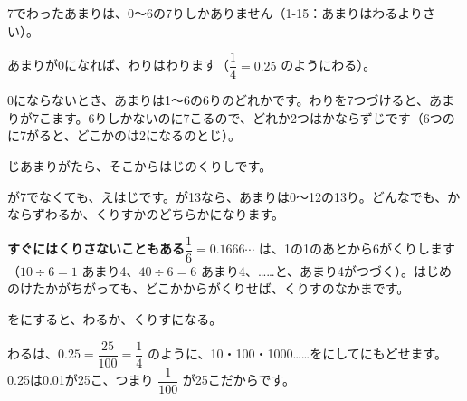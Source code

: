 7でわったあまりは、0〜6の7りしかありません（1-15：あまりはわるよりさい）。
\begin{enumerate}[label={\bkcircled[bkGreen]{\arabic*}}, leftmargin=2.4\zw, itemsep=1pt, topsep=2pt]
\item あまりが0になれば、わりはわります（$\dfrac{1}{4}=0.25$ のようにわる）。
\item 0にならないとき、あまりは1〜6の6りのどれかです。わりを7つづけると、あまりが7こます。6りしかないのに7こるので、どれか2つはかならずじです（6つのに7がると、どこかのは2になるのとじ）。
\item {}じあまりがたら、そこからはじのくりしです。
\end{enumerate}
が7でなくても、えはじです。が13なら、あまりは0〜12の13り。どんなでも、かならずわるか、くりすかのどちらかになります。

\noindent\textbf{すぐにはくりさないこともある}\quad $\dfrac{1}{6}=0.1666\cdots$ は、1の1のあとから6がくりします（$10\div6=1$ あまり4、$40\div6=6$ あまり4、……と、あまり4がつづく）。はじめのけたかがちがっても、どこかからがくりせば、くりすのなかまです。

\begin{taisetsu}
をにすると、わるか、くりすになる。
\end{taisetsu}

わるは、$0.25=\dfrac{25}{100}=\dfrac{1}{4}$ のように、10・100・1000……をにしてにもどせます。0.25は0.01が25こ、つまり $\dfrac{1}{100}$ が25こだからです。

